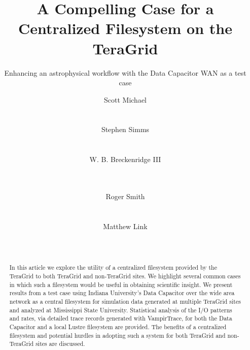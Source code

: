 \documentclass[]{sig-alternate}
\begin{document}
\title{A Compelling Case for a Centralized Filesystem on the TeraGrid}
\subtitle{Enhancing  an astrophysical workflow with the Data Capacitor WAN as a test case}

\author{
\alignauthor Scott Michael\\
	\\
	\\
\alignauthor Stephen Simms\\
	\\
	\\
\alignauthor W. B. Breckenridge III\\
	\\
	\\
	\and
\alignauthor Roger Smith\\
	\\
	\\
\alignauthor Matthew Link\\
	\\
	\\
}

\maketitle

\begin{abstract}
In this article we explore the utility of  a centralized filesystem provided by the TeraGrid to both TeraGrid and non-TeraGrid sites. We highlight several common cases in which such a filesystem would be useful in obtaining scientific insight. We present results from a test case using Indiana University's Data Capacitor over the wide area network as a central filesystem for simulation data generated at multiple TeraGrid sites and analyzed at Mississippi State University. Statistical analysis of the I/O patterns and rates, via detailed trace records generated with VampirTrace, for both the Data Capacitor and a local Lustre filesystem are provided. The benefits of a centralized filesystem and potential hurdles in adopting such a system for both TeraGrid and non-TeraGrid sites are discussed.
\end{abstract}
\end{document}
